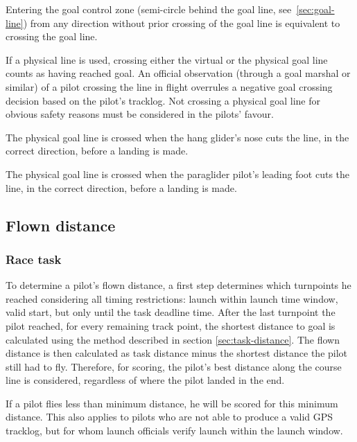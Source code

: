 \documentclass{article}
\begin{document}
\begin{pg}
Entering the goal control zone (semi-circle behind the goal line,
see~\ref{sec:goal-line}) from any direction without prior crossing of the goal
line is equivalent to crossing the goal line.
\end{pg}

If a physical line is used, crossing either the virtual or the physical goal
line counts as having reached goal. An official observation (through a goal
marshal or similar) of a pilot crossing the line in flight overrules a negative
goal crossing decision based on the pilot’s tracklog. Not crossing a physical
goal line for obvious safety reasons must be considered in the pilots’ favour.

\begin{hg}
The physical goal line is crossed when the hang glider’s nose cuts the line, in
the correct direction, before a landing is made.
\end{hg}

\begin{pg}
The physical goal line is crossed when the paraglider pilot’s leading foot cuts
the line, in the correct direction, before a landing is made.
\end{pg}

\subsection{Flown distance}

\subsubsection{Race task}
\label{sec:race-task}
To determine a pilot’s flown distance, a first step determines which turnpoints
he reached considering all timing restrictions: launch within launch time
window, valid start, but only until the task deadline time. After the last
turnpoint the pilot reached, for every remaining track point, the shortest
distance to goal is calculated using the method described in section
\ref{sec:task-distance}. The flown distance is then calculated as task distance
minus the shortest distance the pilot still had to fly. Therefore, for scoring,
the pilot’s best distance along the course line is considered, regardless of
where the pilot landed in the end.

If a pilot flies less than minimum distance, he will be scored for this minimum
distance. This also applies to pilots who are not able to produce a valid GPS
tracklog, but for whom launch officials verify launch within the launch window.
\end{document}
